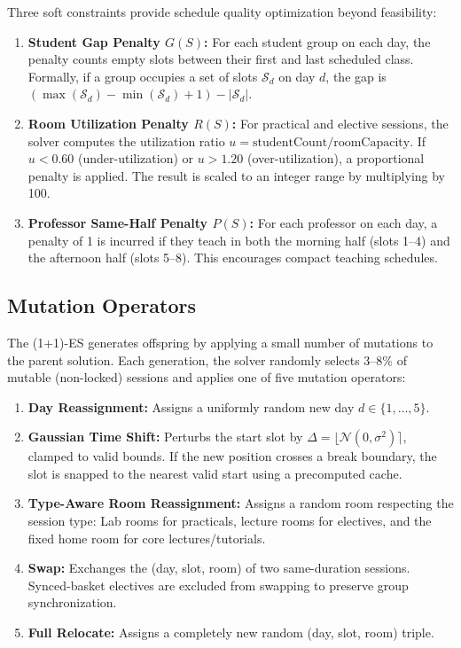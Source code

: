 Three soft constraints provide schedule quality optimization beyond feasibility:

\begin{enumerate}
    \item \textbf{Student Gap Penalty $G(S)$:} For each student group on each day, the penalty counts empty slots between their first and last scheduled class. Formally, if a group occupies a set of slots $\mathcal{S}_d$ on day $d$, the gap is $(\max(\mathcal{S}_d) - \min(\mathcal{S}_d) + 1) - |\mathcal{S}_d|$.

    \item \textbf{Room Utilization Penalty $R(S)$:} For practical and elective sessions, the solver computes the utilization ratio $u = \text{studentCount} / \text{roomCapacity}$. If $u < 0.60$ (under-utilization) or $u > 1.20$ (over-utilization), a proportional penalty is applied. The result is scaled to an integer range by multiplying by 100.

    \item \textbf{Professor Same-Half Penalty $P(S)$:} For each professor on each day, a penalty of 1 is incurred if they teach in both the morning half (slots 1--4) and the afternoon half (slots 5--8). This encourages compact teaching schedules.
\end{enumerate}

\subsection{Mutation Operators}

The (1+1)-ES generates offspring by applying a small number of mutations to the parent solution. Each generation, the solver randomly selects 3--8\% of mutable (non-locked) sessions and applies one of five mutation operators:

\begin{enumerate}
    \item \textbf{Day Reassignment:} Assigns a uniformly random new day $d \in \{1, \dots, 5\}$.
    \item \textbf{Gaussian Time Shift:} Perturbs the start slot by $\Delta = \lfloor \mathcal{N}(0, \sigma^2) \rceil$, clamped to valid bounds. If the new position crosses a break boundary, the slot is snapped to the nearest valid start using a precomputed cache.
    \item \textbf{Type-Aware Room Reassignment:} Assigns a random room respecting the session type: Lab rooms for practicals, lecture rooms for electives, and the fixed home room for core lectures/tutorials.
    \item \textbf{Swap:} Exchanges the (day, slot, room) of two same-duration sessions. Synced-basket electives are excluded from swapping to preserve group synchronization.
    \item \textbf{Full Relocate:} Assigns a completely new random (day, slot, room) triple.
\end{enumerate}

